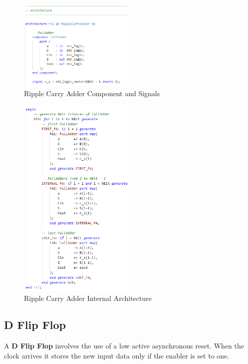 \begin{figure}[H]
    \centering
    \includegraphics[width=0.5\textwidth]{img/Chapter3/RCA-Architecture1.png}
    \caption{Ripple Carry Adder Component and Signals}
    \label{fig:RCAA1}
\end{figure}

\begin{figure}[H]
    \centering
    \includegraphics[width=0.5\textwidth]{img/Chapter3/RCA-Architecture2.png}
    \caption{Ripple Carry Adder Internal Architecture}
    \label{fig:RCAA2}
\end{figure}

\subsection{D Flip Flop}

A \textbf{D Flip Flop} involves the use of a low active asynchronous reset. When the clock arrives it stores the new input data only if the enabler is set to one.

